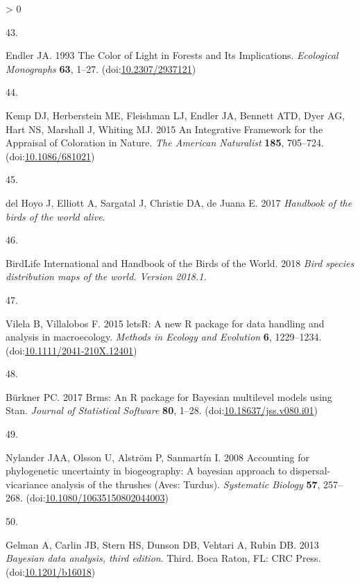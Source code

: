 \documentclass[
  a4paper,
]{article}
\newlength{\cslhangindent}
\newlength{\csllabelwidth}
\newenvironment{CSLReferences}[2] %
 {%
  \setlength{\parindent}{0pt}
  \ifodd #1 \everypar{\setlength{\hangindent}{\cslhangindent}}\ignorespaces\fi
  \ifnum #2 > 0
  \setlength{\parskip}{#2\baselineskip}
  \fi
 }%
 {}
\newcommand{\CSLLeftMargin}[1]{\parbox[t]{\csllabelwidth}{#1}}
\newcommand{\CSLRightInline}[1]{\parbox[t]{\linewidth - \csllabelwidth}{#1}\break}
\begin{document}
\begin{CSLReferences}{0}{0}
\leavevmode\hypertarget{ref-endler1993}{}%
\CSLLeftMargin{43. }
\CSLRightInline{Endler JA. 1993 The {Color} of {Light} in {Forests} and
{Its Implications}. \emph{Ecological Monographs} \textbf{63}, 1--27.
(doi:\href{https://doi.org/10.2307/2937121}{10.2307/2937121})}

\leavevmode\hypertarget{ref-kemp2015}{}%
\CSLLeftMargin{44. }
\CSLRightInline{Kemp DJ, Herberstein ME, Fleishman LJ, Endler JA,
Bennett ATD, Dyer AG, Hart NS, Marshall J, Whiting MJ. 2015 An
{Integrative Framework} for the {Appraisal} of {Coloration} in {Nature}.
\emph{The American Naturalist} \textbf{185}, 705--724.
(doi:\href{https://doi.org/10.1086/681021}{10.1086/681021})}

\leavevmode\hypertarget{ref-delhoyo2017}{}%
\CSLLeftMargin{45. }
\CSLRightInline{del Hoyo J, Elliott A, Sargatal J, Christie DA, de Juana
E. 2017 \emph{Handbook of the birds of the world alive}. }

\leavevmode\hypertarget{ref-birdlifeinternationalandhandbookofthebirdsoftheworld2018}{}%
\CSLLeftMargin{46. }
\CSLRightInline{BirdLife International and Handbook of the Birds of the
World. 2018 \emph{Bird species distribution maps of the world. {Version}
2018.1.} }

\leavevmode\hypertarget{ref-vilela2015}{}%
\CSLLeftMargin{47. }
\CSLRightInline{Vilela B, Villalobos F. 2015 {letsR}: A new {R} package
for data handling and analysis in macroecology. \emph{Methods in Ecology
and Evolution} \textbf{6}, 1229--1234.
(doi:\href{https://doi.org/10.1111/2041-210X.12401}{10.1111/2041-210X.12401})}

\leavevmode\hypertarget{ref-burkner2017}{}%
\CSLLeftMargin{48. }
\CSLRightInline{Bürkner PC. 2017 Brms: {An R} package for {Bayesian}
multilevel models using {Stan}. \emph{Journal of Statistical Software}
\textbf{80}, 1--28.
(doi:\href{https://doi.org/10.18637/jss.v080.i01}{10.18637/jss.v080.i01})}

\leavevmode\hypertarget{ref-nylander2008}{}%
\CSLLeftMargin{49. }
\CSLRightInline{Nylander JAA, Olsson U, Alström P, Sanmartín I. 2008
Accounting for phylogenetic uncertainty in biogeography: {A} bayesian
approach to dispersal-vicariance analysis of the thrushes ({Aves}:
{Turdus}). \emph{Systematic Biology} \textbf{57}, 257--268.
(doi:\href{https://doi.org/10.1080/10635150802044003}{10.1080/10635150802044003})}

\leavevmode\hypertarget{ref-gelman2013}{}%
\CSLLeftMargin{50. }
\CSLRightInline{Gelman A, Carlin JB, Stern HS, Dunson DB, Vehtari A,
Rubin DB. 2013 \emph{Bayesian data analysis, third edition}. Third.
{Boca Raton, FL}: {CRC Press}.
(doi:\href{https://doi.org/10.1201/b16018}{10.1201/b16018})}


\end{CSLReferences}
\end{document}
